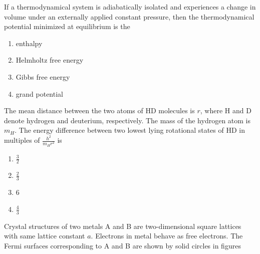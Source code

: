 \iffalse
\chapter{2024}
\author{AI24BTECH11011}
\section{ph}
\fi



\item If a thermodynamical system is adiabatically isolated and experiences a change in volume under an externally applied constant pressure, then the thermodynamical potential minimized at equilibrium is the
\begin{enumerate}
    \item enthalpy
    \item Helmholtz free energy
    \item Gibbs free energy
    \item grand potential
\end{enumerate}
\item The mean distance between the two atoms of HD molecules is $r$, where H and D denote hydrogen and deuterium, respectively. The mass of the hydrogen atom is $m_H$. The energy difference between two lowest lying rotational states of HD in multiples of $\frac{h^2}{m_Hr^2}$ is
\begin{enumerate}
    \item $\frac{3}{2}$
    \item $\frac{2}{3}$
    \item 6
    \item $\frac{4}{3}$
\end{enumerate}
\item Crystal structures of two metals A and B are two-dimensional square lattices with same lattice constant $a$. Electrons in metal behave as free electrons. The Fermi surfaces corresponding to A and B are shown by solid circles in figures
